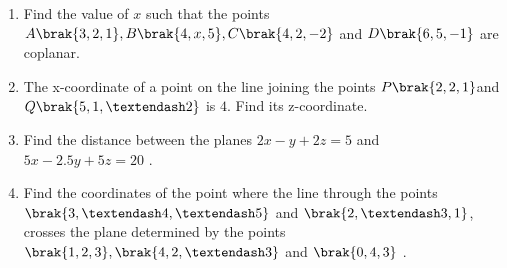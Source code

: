 \begin{enumerate}
\item  Find the value of $x$ such that the points $A\brak{3,2,1}, B\brak{4, x, 5}, C\brak{4,2,-2}$ and $D\brak{6,5,-1}$ are coplanar.
\item The x-coordinate of a point on the line joining the points $P\brak{2, 2, 1}$and $Q\brak{5, 1,–2}$  is $4$. Find its z-coordinate.
\item Find the distance between the planes $2x - y + 2z = 5$ and $5x - 2.5y + 5z = 20$ .
\item Find the coordinates of the point where the line through the points $\brak{3, – 4, – 5}$ and $\brak{2, – 3, 1}$, crosses the plane determined by the points $\brak{1, 2, 3}, \brak{4, 2, – 3}$ and $\brak{0, 4, 3}$ .
\end{enumerate}
